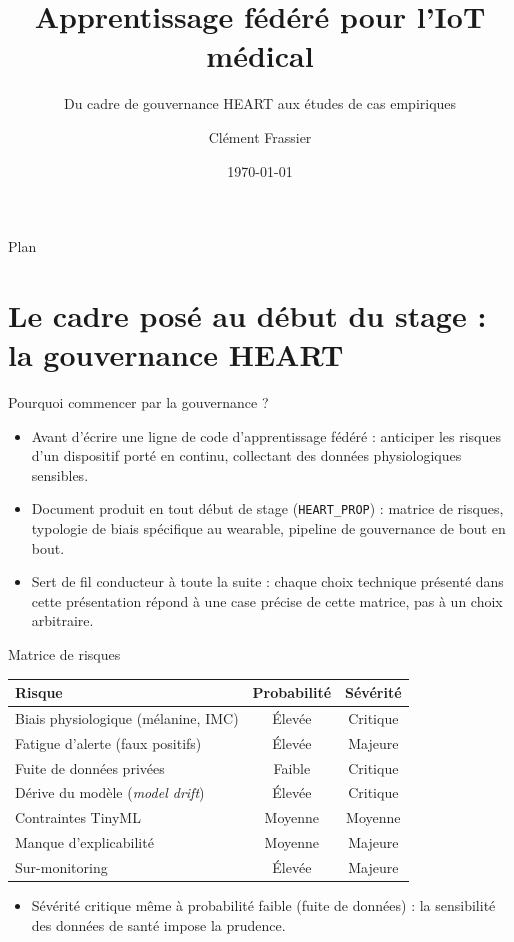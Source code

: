 \documentclass[aspectratio=169,11pt]{beamer}
\title{Apprentissage fédéré pour l'IoT médical}
\subtitle{Du cadre de gouvernance HEART aux études de cas empiriques}
\author{Clément Frassier}
\institute{Stage --- UKM / UEL \\ Encadrante : Asma Abu Samah}
\date{\today}
\begin{document}
\begin{frame}[plain]
  \titlepage
\end{frame}

\begin{frame}{Plan}
  \tableofcontents
\end{frame}

\section{Le cadre posé au début du stage : la gouvernance HEART}

\begin{frame}{Pourquoi commencer par la gouvernance ?}
  \begin{itemize}
    \item Avant d'écrire une ligne de code d'apprentissage fédéré : anticiper
      les risques d'un dispositif porté en continu, collectant des données
      physiologiques sensibles.
    \item Document produit en tout début de stage (\texttt{HEART\_PROP}) :
      matrice de risques, typologie de biais spécifique au wearable, pipeline
      de gouvernance de bout en bout.
    \item Sert de fil conducteur à toute la suite : chaque choix technique
      présenté dans cette présentation répond à une case précise de cette
      matrice, pas à un choix arbitraire.
  \end{itemize}
\end{frame}

\begin{frame}{Matrice de risques}
  \centering
  \small
  \begin{tabular}{lcc}
    \toprule
    Risque & Probabilité & Sévérité \\
    \midrule
    Biais physiologique (mélanine, IMC) & Élevée & Critique \\
    Fatigue d'alerte (faux positifs) & Élevée & Majeure \\
    Fuite de données privées & Faible & Critique \\
    Dérive du modèle (\emph{model drift}) & Élevée & Critique \\
    Contraintes TinyML & Moyenne & Moyenne \\
    Manque d'explicabilité & Moyenne & Majeure \\
    Sur-monitoring & Élevée & Majeure \\
    \bottomrule
  \end{tabular}
  \vspace{1em}
  \begin{itemize}
    \small
    \item Sévérité critique même à probabilité faible (fuite de données) :
      la sensibilité des données de santé impose la prudence.
  \end{itemize}
\end{frame}
\end{document}

